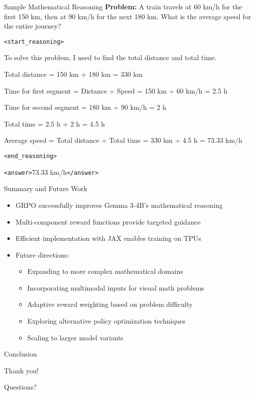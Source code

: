 \documentclass{beamer}
\begin{document}
\begin{frame}{Sample Mathematical Reasoning}
  \textbf{Problem:} A train travels at 60 km/h for the first 150 km, then at 90 km/h for the next 180 km. What is the average speed for the entire journey?
  
  \vspace{0.3cm}
  \footnotesize
  \texttt{<start\_reasoning>}
  
  To solve this problem, I need to find the total distance and total time.
  
  Total distance = 150 km + 180 km = 330 km
  
  Time for first segment = Distance ÷ Speed = 150 km ÷ 60 km/h = 2.5 h
  
  Time for second segment = 180 km ÷ 90 km/h = 2 h
  
  Total time = 2.5 h + 2 h = 4.5 h
  
  Average speed = Total distance ÷ Total time = 330 km ÷ 4.5 h = 73.33 km/h
  
  \texttt{<end\_reasoning>}
  
  \texttt{<answer>}73.33 km/h\texttt{</answer>}
\end{frame}

\begin{frame}{Summary and Future Work}
  \begin{itemize}
    \item GRPO successfully improves Gemma 3-4B's mathematical reasoning
    \item Multi-component reward functions provide targeted guidance
    \item Efficient implementation with JAX enables training on TPUs
    \item Future directions:
    \begin{itemize}
      \item Expanding to more complex mathematical domains
      \item Incorporating multimodal inputs for visual math problems
      \item Adaptive reward weighting based on problem difficulty
      \item Exploring alternative policy optimization techniques
      \item Scaling to larger model variants
    \end{itemize}
  \end{itemize}
\end{frame}

\begin{frame}{Conclusion}
  \begin{center}
    \Large Thank you!
    
    \vspace{0.5cm}
    \normalsize Questions?
  \end{center}
\end{frame}
\end{document}
